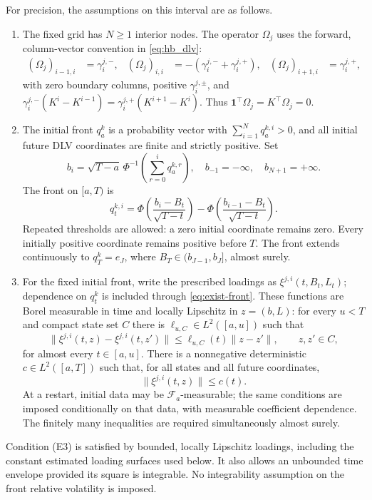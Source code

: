 \documentclass[11pt]{article}
\newcommand{\one}{\mathbf 1}
\theoremstyle{plain}
\theoremstyle{definition}
\theoremstyle{remark}
\begin{document}
For precision, the assumptions on this interval are as follows.
\begin{enumerate}[label=(E\arabic*),leftmargin=*]
 \item The fixed grid has $N\ge1$ interior nodes. The operator $\Omega_j$
 uses the forward, column-vector convention in \eqref{eq:hb_dlv}:
 \begin{equation}\label{eq:exist-forward}
 \begin{aligned}
  (\Omega_j)_{i-1,i}&=\gamma_i^{j,-},&
  (\Omega_j)_{i,i}&=-(\gamma_i^{j,-}+\gamma_i^{j,+}),&
  (\Omega_j)_{i+1,i}&=\gamma_i^{j,+},
 \end{aligned}
 \end{equation}
 with zero boundary columns, positive $\gamma_i^{j,\pm}$, and
 $\gamma_i^{j,-}(K^i-K^{i-1})=
  \gamma_i^{j,+}(K^{i+1}-K^i)$.
 Thus $\one^\top\Omega_j=K^\top\Omega_j=0$.
 \item The initial front $q_a^k$ is a probability vector with
 $\sum_{i=1}^Nq_a^{k,i}>0$, and all initial future DLV coordinates are
 finite and strictly positive. Set
 \[
 b_i=\sqrt{T-a}\,\Phi^{-1}\!\left(\sum_{r=0}^i q_a^{k,r}\right),
 \quad b_{-1}=-\infty,\quad b_{N+1}=+\infty.
 \]
 The front on $[a,T)$ is
 \begin{equation}\label{eq:exist-front}
 q_t^{k,i}
  =\Phi\!\left(\frac{b_i-B_t}{\sqrt{T-t}}\right)
   -\Phi\!\left(\frac{b_{i-1}-B_t}{\sqrt{T-t}}\right).
 \end{equation}
 Repeated thresholds are allowed: a zero initial coordinate remains zero.
 Every initially positive coordinate remains positive before $T$.
 The front extends continuously to $q_T^k=e_J$, where
 $B_T\in(b_{J-1},b_J]$, almost surely.
 \item For the fixed initial front, write the prescribed loadings as
 $\xi^{j,i}(t,B_t,L_t)$; dependence on $q_t^k$ is included through
 \eqref{eq:exist-front}. These functions are Borel measurable in time
 and locally Lipschitz in $z=(b,L)$: for every $u<T$ and compact state
 set $C$ there is $\ell_{u,C}\in L^2([a,u])$ such that
 \[
 \lVert\xi^{j,i}(t,z)-\xi^{j,i}(t,z')\rVert
 \le\ell_{u,C}(t)\lVert z-z'\rVert,
 \qquad z,z'\in C,
 \]
 for almost every $t\in[a,u]$. There is a nonnegative deterministic
 $c\in L^2([a,T])$ such that, for all states and all future coordinates,
 \begin{equation}\label{eq:exist-energy-envelope}
  \lVert\xi^{j,i}(t,z)\rVert\le c(t).
 \end{equation}
 At a restart, initial data may be $\mathcal F_a$-measurable; the same
 conditions are imposed conditionally on that data, with measurable
 coefficient dependence. The finitely many inequalities are required
 simultaneously almost surely.
\end{enumerate}
Condition (E3) is satisfied by bounded, locally Lipschitz loadings, including
the constant estimated loading surfaces used below. It also allows an
unbounded time envelope provided its square is integrable. No integrability
assumption on the front relative volatility is imposed.
\end{document}
